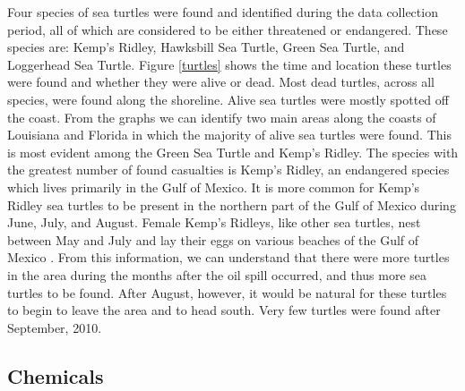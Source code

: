 \documentclass[authoryear,12pt]{elsarticle}
\begin{document}
Four species of sea turtles were found and identified during the data collection period, all of which are considered to be either threatened or endangered. These species are: Kemp's Ridley, Hawksbill Sea Turtle, Green Sea Turtle, and Loggerhead Sea Turtle. Figure \ref{turtles} shows the  {time and location} these turtles were found and whether they were {alive} or dead. Most dead turtles,  {across} all species, were found along the shoreline. Alive sea turtles were mostly spotted off the coast.  {From the graphs we can identify} two main areas along the coasts of Louisiana and Florida in which the  {majority} of  {a}live sea turtles were found.  This is most evident among the Green Sea Turtle and Kemp's Ridley. The species with the greatest number of found casualties  {is} Kemp's Ridley, an endangered species which lives primarily in the Gulf of Mexico.  It is more common for Kemp's Ridley sea turtles to be present in the northern part of the Gulf of Mexico during June, July, and August. Female Kemp's Ridleys, like other sea turtles, nest between May and July and lay their eggs on various beaches of the Gulf of Mexico  \citep{turtles}. From this information, we can understand that there were more turtles in the area during the months after the oil spill occurred, and thus more sea turtles to be found.  After August, however, it would be natural for these turtles to begin to leave the area and  {to} head south. Very few turtles were found after September, 2010.

\subsection{Chemicals}
\end{document}
